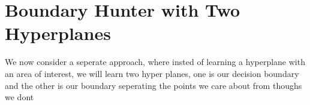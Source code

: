 \documentclass{article}
\begin{document}
\section{Boundary Hunter with Two Hyperplanes}
We now consider a seperate approach, where insted of learning a hyperplane with an area of interest, we will learn two hyper planes, one is our decision boundary and the other is our boundary seperating the points we care about from thoughs we dont
\end{document}
